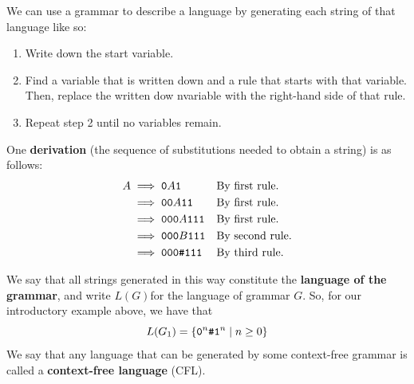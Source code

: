 \documentclass[letterpaper]{article}
\begin{document}
We can use a grammar to describe a language by generating each string of that language like so: 
\begin{enumerate}
    \item Write down the start variable. 
    \item Find a variable that is written down and a rule that starts with that variable. Then, replace the written dow nvariable with the right-hand side of that rule. 
    \item Repeat step 2 until no variables remain. 
\end{enumerate}

One \textbf{derivation} (the sequence of substitutions needed to obtain a string) is as follows:
\begin{equation*}
    \begin{aligned}
        A &\implies \texttt{0}A\texttt{1} && \text{By first rule.} \\ 
            &\implies \texttt{00}A\texttt{11} && \text{By first rule.} \\
            &\implies \texttt{000}A\texttt{111} && \text{By first rule.} \\
            &\implies \texttt{000}B\texttt{111} && \text{By second rule.} \\
            &\implies \texttt{000\#111} && \text{By third rule.} \\
    \end{aligned}
\end{equation*}

We say that all strings generated in this way constitute the \textbf{language of the grammar}, and write $L(G)$for the language of grammar $G$. So, for our introductory example above, we have that 
\[L(G_1) = \{\texttt{0}^n \texttt{\#} \texttt{1}^n \mid n \geq 0\}\]
We say that any language that can be generated by some context-free grammar is called a \textbf{context-free language} (CFL). 
\end{document}
